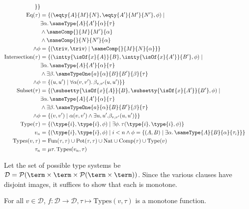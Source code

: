 \begin{align*}
  \}
  \}\\
  \text{Eq}(\tau) &= \{
    (\eqty{A}{M}{N}, \eqty{A'}{M'}{N'}, \phi) \mid \\
  &\exists \alpha.\, \sameType{A}{A'}{\alpha}{\tau}\\
  &\land\sameComp{}{M}{M'}{\alpha}\\
  &\land\sameComp{}{N}{N'}{\alpha}\\
  \land\phi &= \{(\triv, \triv) \mid \sameComp{}{M}{N}{\alpha}
  \}
  \}\\
  \text{Intersection}(\tau) &= \{
    (\intty{\isOf{x}{A}}{B}, \intty{\isOf{x}{A'}}{B'},\phi) \mid \\
    &\exists \alpha.\, \sameType{A}{A'}{\alpha}{\tau} \\
    &\land\exists \beta.\, \sameTypeOne{a}{\alpha}{B}{B'}{\beta}{\tau} \\
    \land\phi &= \{(u,u') \mid \forall \alpha(v,v').\, \beta_{v,v'}(u,u')\}
  \}\\
  \text{Subset}(\tau) &= \{
    (\subsetty{\isOf{x}{A}}{B}, \subsetty{\isOf{x}{A'}}{B'},\phi) \mid \\
    &\exists \alpha.\, \sameType{A}{A'}{\alpha}{\tau} \\
    &\land\exists \beta.\, \sameTypeOne{a}{\alpha}{B}{B'}{\beta}{\tau} \\
    \land\phi &= \{(v,v') \mid \alpha(v,v') \land \exists u,u'.\beta_{v,v'}(u,u')\}
  \}\\
  \text{Type}(\tau) &= \{(\type{i}, \type{i}, \phi) \mid \exists \phi.\, \tau(\type{i}, \type{i}, \phi)\}\\
  v_n &= \{(\type{i}, \type{i}, \phi) \mid i < n \land \phi = \{(A,B) 
  \mid \exists \alpha.\, \sameType{A}{B}{\alpha}{\tau_i}\}\}\\
  \text{Types}(v,\tau) &= \text{Fun}(\tau,\tau) \cup \text{Pot}(\tau,\tau) \cup \text{Nat} \cup \text{Comp}(\tau) \cup \text{Type}(v)\\
  \tau_n &= \mu \tau.\, \text{Types}(v_n,\tau)
\end{align*}

Let the set of possible type systems be $\mathcal{D} = 
\mathcal{P}(\term \times \term \times \mathcal{P}(\term \times \term))$.
Since the various clauses have disjoint images, it suffices to show that each is monotone.

\iffalse
\begin{lemma}\label{lemma:monotone}
For all $v \in \mathcal{D}$, $f : \mathcal{D} \to \mathcal{D}, \tau \mapsto \text{Types}(v,\tau)$ is a monotone function.
\end{lemma}

